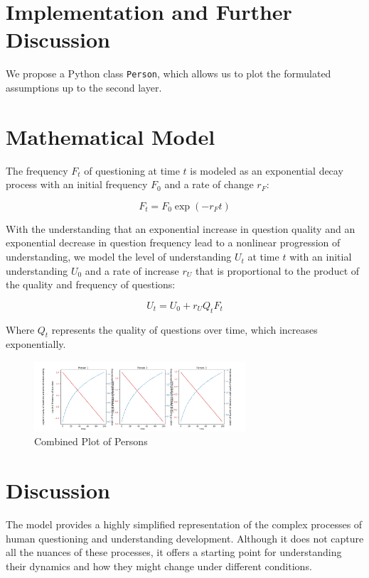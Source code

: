 \documentclass{article}
\begin{document}
    \section{Implementation and Further Discussion}

    We propose a Python class \texttt{Person}, which allows us to plot the formulated assumptions up to the second layer.


    \section{Mathematical Model}

    The frequency $F_t$ of questioning at time $t$ is modeled as an exponential decay process with an initial frequency $F_0$ and a rate of change $r_F$:

    \[
        F_t = F_0 \exp(-r_F t)
    \]

    With the understanding that an exponential increase in question quality and an exponential decrease in question frequency lead to a nonlinear progression of understanding, we model the level of understanding $U_t$ at time $t$ with an initial understanding $U_0$ and a rate of increase $r_U$ that is proportional to the product of the quality and frequency of questions:

    \[
        U_t = U_0 + r_U Q_t F_t
    \]

    Where $Q_t$ represents the quality of questions over time, which increases exponentially.

    \begin{figure}[ht]
        \centering
        \includegraphics[width=0.7\textwidth]{combined_plot.png}
        \caption{Combined Plot of Persons}
        \label{fig:combinedplot}
    \end{figure}


    \section{Discussion}

    The model provides a highly simplified representation of the complex processes of human questioning and understanding development. Although it does not capture all the nuances of these processes, it offers a starting point for understanding their dynamics and how they might change under different conditions.
\end{document}

